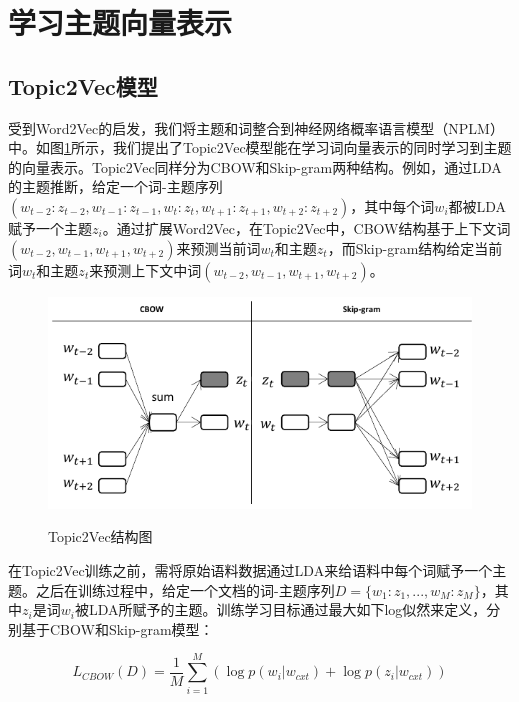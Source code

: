 \documentclass[master]{njuthesis}
\begin{document}
\section{学习主题向量表示}\label{sec_chap3_topic2vec}

\subsection{Topic2Vec模型}

受到Word2Vec的启发，我们将主题和词整合到神经网络概率语言模型（NPLM）中。如图\ref{fig:topic2vec}所示，我们提出了Topic2Vec模型能在学习词向量表示的同时学习到主题的向量表示。Topic2Vec同样分为CBOW和Skip-gram两种结构。例如，通过LDA的主题推断，给定一个词-主题序列$(w_{t-2}:z_{t-2}, w_{t-1}:z_{t-1}, w_t:z_t, w_{t+1}:z_{t+1}, w_{t+2}:z_{t+2})$，其中每个词$w_i$都被LDA赋予一个主题$z_i$。通过扩展Word2Vec，在Topic2Vec中，CBOW结构基于上下文词$(w_{t-2}, w_{t-1}, w_{t+1}, w_{t+2})$来预测当前词$w_t$和主题$z_t$，而Skip-gram结构给定当前词$w_t$和主题$z_t$来预测上下文中词$(w_{t-2}, w_{t-1}, w_{t+1}, w_{t+2})$。

\begin{figure}[htbp]
  \centering
  \includegraphics[width= 1.0\textwidth]{figures//topic2vec_chap3.pdf}\\
  \caption{Topic2Vec结构图}\label{fig:topic2vec}
\end{figure}

在Topic2Vec训练之前，需将原始语料数据通过LDA来给语料中每个词赋予一个主题。之后在训练过程中，给定一个文档的词-主题序列$D=\{w_1:z_1, ..., w_M:z_M\}$，其中$z_i$是词$w_i$被LDA所赋予的主题。训练学习目标通过最大如下log似然来定义，分别基于CBOW和Skip-gram模型：

	\begin{equation}
	{L}_{CBOW}(D)=\frac{1}{M}\sum_{i=1}^{M}(\log p(w_{i}|w_{cxt})+\log p(z_{i}|w_{cxt}))
	\end{equation}
	
\end{document}
